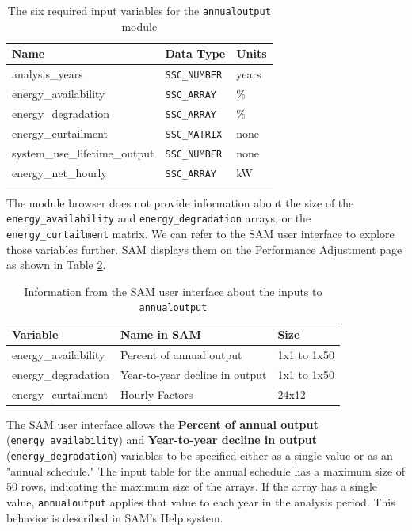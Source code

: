 \documentclass{article}
\begin{document}
\begin{table}[ht]
\begin{center}
\begin{tabular}{lll}
Name & Data Type & Units \\
\hline
analysis\_years & \texttt{SSC\_NUMBER} & years \\
energy\_availability & \texttt{SSC\_ARRAY} & \% \\
energy\_degradation & \texttt{SSC\_ARRAY} & \% \\
energy\_curtailment & \texttt{SSC\_MATRIX} & none \\
system\_use\_lifetime\_output & \texttt{SSC\_NUMBER} &  none \\
energy\_net\_hourly & \texttt{SSC\_ARRAY} &  kW \\
\end{tabular}
\caption{The six required input variables for the \texttt{annualoutput} module}\label{tab_annualoutput}
\end{center}
\end{table}

The module browser does not provide information about the size of the \texttt{energy\_availability} and \texttt{energy\_degradation} arrays, or the \texttt{energy\_curtailment} matrix. We can refer to the SAM user interface to explore those variables further. SAM displays them on the Performance Adjustment page as shown in Table \ref{tab_performance_adjustment}.

 \begin{table}[ht]
\begin{center}
\begin{tabular}{lll}
Variable & Name in SAM & Size \\
\hline
energy\_availability & Percent of annual output & 1x1 to 1x50 \\
energy\_degradation & Year-to-year decline in output & 1x1 to 1x50 \\
energy\_curtailment & Hourly Factors & 24x12 \\
\end{tabular}
\caption{Information from the SAM user interface about the inputs to \texttt{annualoutput}}\label{tab_performance_adjustment}
\end{center}
\end{table}

The SAM user interface allows the \textbf{Percent of annual output} (\texttt{energy\_availability}) and \textbf{Year-to-year decline in output} (\texttt{energy\_degradation}) variables to be specified either as a single value or as an "annual schedule." The input table for the annual schedule has a maximum size of 50 rows, indicating the maximum size of the arrays. If the array has a single value, \texttt{annualoutput} applies that value to each year in the analysis period. This behavior is described in SAM's Help system.
\end{document}
